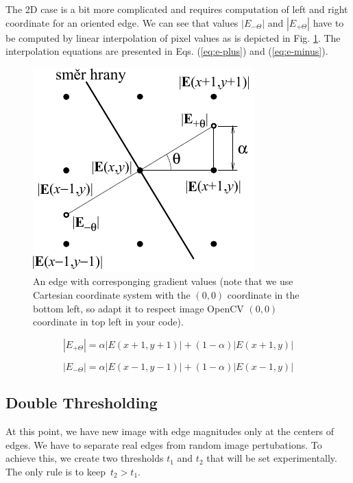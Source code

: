 \documentclass[12pt]{article}
\begin{document}
\noindent
The 2D case is a bit more complicated and requires computation of left and right coordinate for an oriented edge.
We can see that values $|E_{-\Theta}|$ and $|E_{+\Theta}|$ have to be computed by linear interpolation of pixel values as is depicted in Fig. \ref{fig:pixel-scheme}.
The interpolation equations are presented in Eqs. (\ref{eq:e-plus}) and (\ref{eq:e-minus}).

\begin{figure}[h]
\begin{centering}
    \includegraphics{pixel_scheme}
    \caption{An edge with corresponging gradient values (note that we use Cartesian coordinate system with the $(0, 0)$ coordinate in the bottom left, so adapt it to respect image OpenCV $(0, 0)$ coordinate in top left in your code).}
    \label{fig:pixel-scheme}
\end{centering}
\end{figure}

\begin{equation}
    |E_{+\Theta}| = \alpha |E(x + 1, y + 1)| + (1 - \alpha) |E(x + 1, y)|
    \label{eq:e-plus}
\end{equation}

\begin{equation}
    |E_{-\Theta}| = \alpha |E(x - 1, y - 1)| + (1 - \alpha) |E(x - 1, y)|
    \label{eq:e-minus}
\end{equation}

\subsection*{Double Thresholding}

At this point, we have new image with edge magnitudes only at the centers of edges.
We have to separate real edges from random image pertubations.
To achieve this, we create two thresholds $t_1$ and $t_2$ that will be set experimentally.
The only rule is to keep~$t_2 > t_1$.
\end{document}
